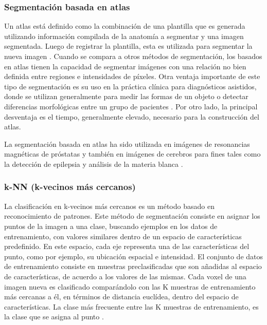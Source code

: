 \subsubsection{Segmentación basada en atlas}
Un atlas está definido como la combinación de una plantilla que es generada utilizando información compilada de la anatomía a segmentar y una imagen segmentada. Luego de registrar la plantilla, esta es utilizada para segmentar la nueva imagen \citep{cabezas2011review}. Cuando se compara a otros métodos de segmentación, los basados en atlas tienen la capacidad de segmentar imágenes con una relación no bien definida entre regiones e intensidades de píxeles. Otra ventaja importante de este tipo de segmentación es su uso en la práctica clínica para diagnósticos asistidos, donde se utilizan generalmente para medir las formas de un objeto o detectar diferencias morfológicas entre un grupo de pacientes \citep{kalinic2009atlas}. Por otro lado, la principal desventaja es el tiempo, generalmente elevado, necesario para la construcción del atlas.
 
La segmentación basada en atlas ha sido utilizada en imágenes de resonancias magnéticas de próstatas \citep{gubern2009atlas, klein2007segmentation, martin2010automated} y también en imágenes de cerebros para fines tales como la detección de epilepsia \citep{nagsemi} y análisis de la materia blanca \citep{lawes2008atlas}.

\subsubsection{k-NN (k-vecinos más cercanos)}
La clasificación en k-vecinos más cercanos es un método basado en reconocimiento de patrones. Este método de segmentación consiste en asignar los puntos de la imagen a una clase, buscando ejemplos en los datos de entrenamiento, con valores similares dentro de un espacio de características predefinido. En este espacio, cada eje representa una de las características del punto, como por ejemplo, su ubicación espacial e intensidad. El conjunto de datos de entrenamiento consiste en muestras preclasificadas que son añadidas al espacio de características, de acuerdo a los valores de las mismas. Cada voxel de una imagen nueva es clasificado comparándolo con las K muestras de entrenamiento más cercanas a él, en términos de distancia euclídea, dentro del espacio de características. La clase más frecuente entre las K muestras de entrenamiento, es la clase que se asigna al punto \citep{anbeek2008automated}.

